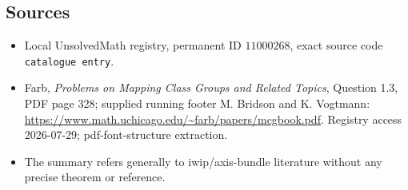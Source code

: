 \documentclass[11pt]{article}
\begin{document}
\subsection{Sources}
\begin{itemize}
\item Local UnsolvedMath registry, permanent ID \(11000268\), exact source code \texttt{catalogue entry}.
\item Farb, \emph{Problems on Mapping Class Groups and Related Topics}, Question 1.3, PDF page 328; supplied running footer M. Bridson and K. Vogtmann: \url{https://www.math.uchicago.edu/~farb/papers/mcgbook.pdf}. Registry access 2026-07-29; pdf-font-structure extraction.
\item The summary refers generally to iwip/axis-bundle literature without any precise theorem or reference.
\end{itemize}
\end{document}
